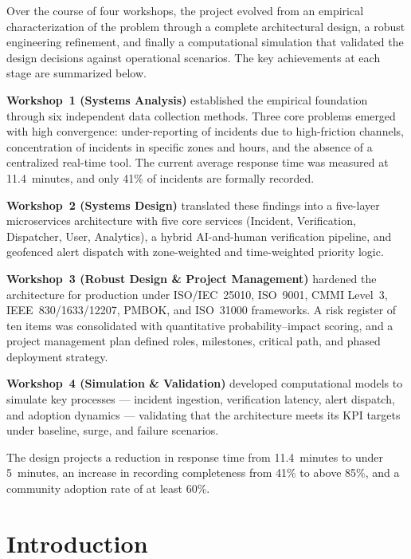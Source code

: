 \documentclass[11pt,a4paper]{article}
\begin{document}
Over the course of four workshops, the project evolved from an empirical characterization of the problem through a complete architectural design, a robust engineering refinement, and finally a computational simulation that validated the design decisions against operational scenarios. The key achievements at each stage are summarized below.

\textbf{Workshop~1 (Systems Analysis)} established the empirical foundation through six independent data collection methods. Three core problems emerged with high convergence: under-reporting of incidents due to high-friction channels, concentration of incidents in specific zones and hours, and the absence of a centralized real-time tool. The current average response time was measured at 11.4~minutes, and only 41\% of incidents are formally recorded.

\textbf{Workshop~2 (Systems Design)} translated these findings into a five-layer microservices architecture with five core services (Incident, Verification, Dispatcher, User, Analytics), a hybrid AI-and-human verification pipeline, and geofenced alert dispatch with zone-weighted and time-weighted priority logic.

\textbf{Workshop~3 (Robust Design \& Project Management)} hardened the architecture for production under ISO/IEC~25010, ISO~9001, CMMI Level~3, IEEE~830/1633/12207, PMBOK, and ISO~31000 frameworks. A risk register of ten items was consolidated with quantitative probability--impact scoring, and a project management plan defined roles, milestones, critical path, and phased deployment strategy.

\textbf{Workshop~4 (Simulation \& Validation)} developed computational models to simulate key processes --- incident ingestion, verification latency, alert dispatch, and adoption dynamics --- validating that the architecture meets its KPI targets under baseline, surge, and failure scenarios.

The design projects a reduction in response time from 11.4~minutes to under 5~minutes, an increase in recording completeness from 41\% to above 85\%, and a community adoption rate of at least 60\%.


\section{Introduction}
\end{document}
